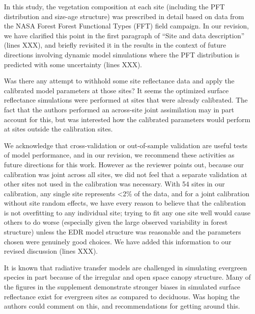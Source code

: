 In this study, the vegetation composition at each site (including the PFT distribution and size-age structure) was prescribed in detail based on data from the NASA Forest Forest Functional Types (FFT) field campaign.
In our revision, we have clarified this point in the first paragraph of ``Site and data description'' (lines XXX),
and briefly revisited it in the results in the context of future directions involving dynamic model simulations where the PFT distribution is predicted with some uncertainty (lines XXX).

\begin{reviewer}
  Was there any attempt to withhold some site reflectance data and apply the calibrated model parameters at those sites?
  It seems the optimized surface reflectance simulations were performed at sites that were already calibrated.
  The fact that the authors performed an across-site joint assimilation may in part account for this, but was interested how the calibrated parameters would perform at sites outside the calibration sites.
\end{reviewer}

We acknowledge that cross-validation or out-of-sample validation are useful tests of model performance, and in our revision, we recommend these activities as future directions for this work.
However as the reviewer points out, because our calibration was joint across all sites, we did not feel that a separate validation at other sites not used in the calibration was necessary.
With 54 sites in our calibration, any single site represents <2\% of the data, and for a joint calibration without site random effects, we have every reason to believe that the calibration is not overfitting to any individual site;
trying to fit any one site well would cause others to do worse (especially given the large observed variability in forest structure) unless the EDR model structure was reasonable and the parameters chosen were genuinely good choices.
We have added this information to our revised discussion (lines XXX).

\begin{reviewer}
  It is known that radiative transfer models are challenged in simulating evergreen species in part because of the irregular and open space canopy structure.
  Many of the figures in the supplement demonstrate stronger biases in simulated surface reflectance exist for evergreen sites as compared to deciduous. Was hoping the authors could comment on this, and recommendations for getting around this.
\end{reviewer}

